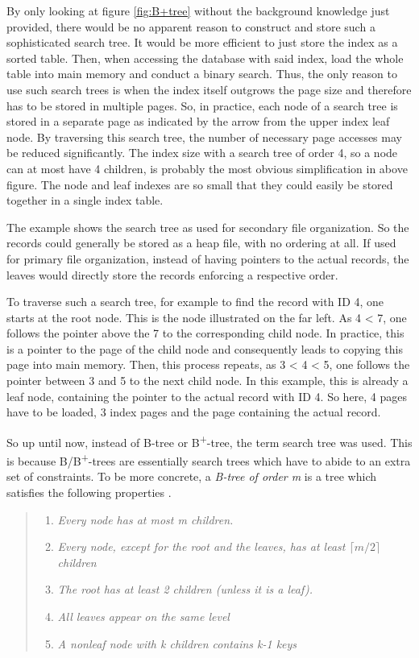 By only looking at figure \ref{fig:B+tree} without the background knowledge just provided, there would be no apparent reason to construct and store such a sophisticated search tree. It would be more efficient to just store the index as a sorted table. Then, when accessing the database with said index, load the whole table into main memory and conduct a binary search. Thus, the only reason to use such search trees is when the index itself outgrows the page size and therefore has to be stored in multiple pages. So, in practice, each node of a search tree is stored in a separate page as indicated by the arrow from the upper index leaf node. By traversing this search tree, the number of necessary page accesses may be reduced significantly. The index size with a search tree of order 4, so a node can at most have 4 children, is probably the most obvious simplification in above figure. The node and leaf indexes are so small that they could easily be stored together in a single index table.\par 
The example shows the search tree as used for secondary file organization. So the records could generally be stored as a heap file, with no ordering at all. If used for primary file organization, instead of having pointers to the actual records, the leaves would directly store the records enforcing a respective order.\par
To traverse such a search tree, for example to find the record with ID 4, one starts at the root node. This is the node illustrated on the far left. As 4 < 7, one follows the pointer above the 7 to the corresponding child node. In practice, this is a pointer to the page of the child node and consequently leads to copying this page into main memory. Then, this process repeats, as 3 < 4 < 5, %
one follows the pointer between 3 and 5 to the next child node. In this example, this is already a leaf node, containing the pointer to the actual record with ID 4. So here, 4 pages have to be loaded, 3 index pages and the page containing the actual record.\par
So up until now, instead of B-tree or B\textsuperscript{+}-tree, the term search tree was used. This is because B/B\textsuperscript{+}-trees are essentially search trees which have to abide to an extra set of constraints. To be more concrete, a \emph{B-tree of order m} is a tree which satisfies the following properties \cite{SortingSearchingBible}.

\begin{quote}
	\begin{enumerate}
		\item\textit{Every node has at most m children. }
		\item\textit{Every node, except for the root and the leaves, has at least $\lceil m/2 \rceil$ children}
		\item\textit{The root has at least 2 children (unless it is a leaf).}
		\item\textit{All leaves appear on the same level}
		\item\textit{A nonleaf node with k children contains k-1 keys}
	\end{enumerate}
\end{quote}


